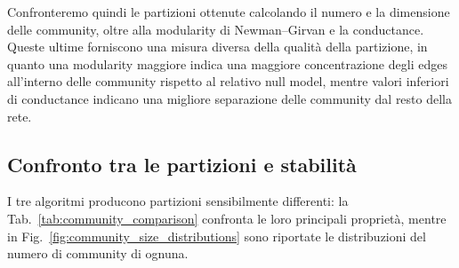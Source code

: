 \documentclass[twocolumn]{article}
\begin{document}
   Confronteremo quindi le partizioni ottenute calcolando il numero e la dimensione delle community, oltre alla modularity di Newman--Girvan e la conductance. Queste ultime forniscono una misura diversa della qualità della partizione, in quanto una modularity maggiore indica una maggiore concentrazione degli edges all'interno delle community rispetto al relativo null model, mentre valori inferiori di conductance indicano una migliore separazione delle community dal resto della rete. 


   \subsection{Confronto tra le partizioni e stabilità}

   I tre algoritmi producono partizioni sensibilmente differenti: la Tab.~\ref{tab:community_comparison} confronta le loro principali proprietà, mentre in Fig.~\ref{fig:community_size_distributions} sono riportate le distribuzioni del numero di community di ognuna.

   \begin{table}[htb]
      \centering
      \caption{Confronto delle principali proprietà delle partizioni ottenute dai tre algoritmi.}
      \label{tab:community_comparison}
   \end{table}
\end{document}
